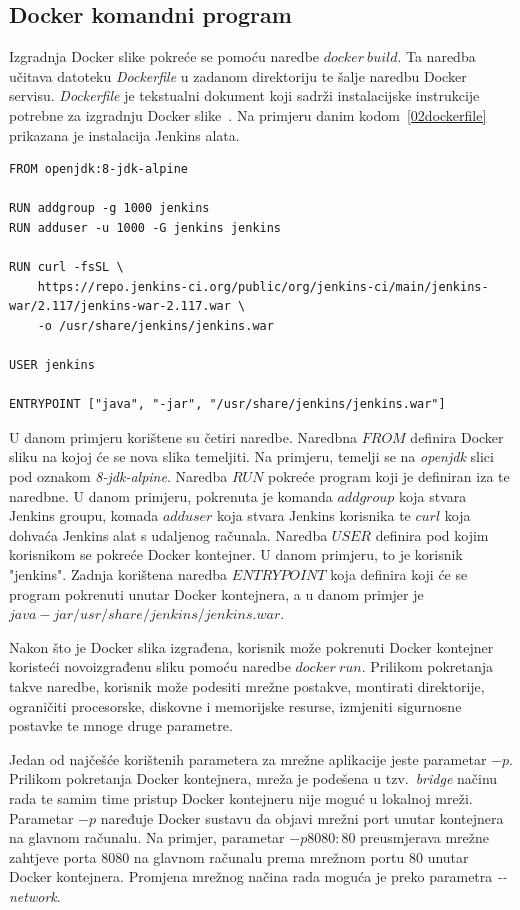 \subsection{Docker komandni program}
Izgradnja Docker slike pokreće se pomoću naredbe $docker~build$. Ta naredba učitava datoteku
\textit{Dockerfile} u zadanom direktoriju te šalje naredbu Docker servisu. \textit{Dockerfile} je
tekstualni dokument koji sadrži instalacijske instrukcije potrebne za izgradnju Docker
slike~\citep{kacamarga2015lightweight}. Na primjeru danim kodom~\ref{02dockerfile} prikazana je
instalacija Jenkins alata.

\begin{lstlisting}[float=h]
FROM openjdk:8-jdk-alpine

RUN addgroup -g 1000 jenkins
RUN adduser -u 1000 -G jenkins jenkins

RUN curl -fsSL \
    https://repo.jenkins-ci.org/public/org/jenkins-ci/main/jenkins-war/2.117/jenkins-war-2.117.war \
    -o /usr/share/jenkins/jenkins.war

USER jenkins

ENTRYPOINT ["java", "-jar", "/usr/share/jenkins/jenkins.war"]
\end{lstlisting}

U danom primjeru korištene su četiri naredbe. Naredbna $FROM$ definira Docker sliku na kojoj će se
nova slika temeljiti. Na primjeru, temelji se na \textit{openjdk} slici pod oznakom
\textit{8-jdk-alpine}. Naredba $RUN$ pokreće program koji je definiran iza te naredbne. U danom
primjeru, pokrenuta je komanda $addgroup$ koja stvara Jenkins groupu, komada $adduser$ koja stvara
Jenkins korisnika te $curl$ koja dohvaća Jenkins alat s udaljenog računala.
Naredba $USER$ definira pod kojim korisnikom se pokreće Docker kontejner. U danom primjeru, to je
korisnik "jenkins". Zadnja korištena naredba $ENTRYPOINT$ koja definira koji će se program pokrenuti
unutar Docker kontejnera, a u danom primjer je $java -jar /usr/share/jenkins/jenkins.war$.

Nakon što je Docker slika izgrađena, korisnik može pokrenuti Docker kontejner koristeći
novoizgrađenu sliku pomoću naredbe $docker~run$. Prilikom pokretanja takve naredbe, korisnik može
podesiti mrežne postakve, montirati direktorije, ograničiti procesorske, diskovne i memorijske
resurse, izmjeniti sigurnosne postavke te mnoge druge parametre.

Jedan od najčešće korištenih parametera za mrežne aplikacije jeste parametar $-p$. Prilikom
pokretanja Docker kontejnera, mreža je podešena u tzv.~\textit{bridge} načinu rada te samim time
pristup Docker kontejneru nije moguć u lokalnoj mreži. Parametar $-p$ naređuje Docker sustavu
da objavi mrežni port unutar kontejnera na glavnom računalu. Na primjer, parametar $-p 8080:80$
preusmjerava mrežne zahtjeve porta 8080 na glavnom računalu prema mrežnom portu 80 unutar Docker
kontejnera. Promjena mrežnog načina rada moguća je preko parametra \textit{-{}-network}.

